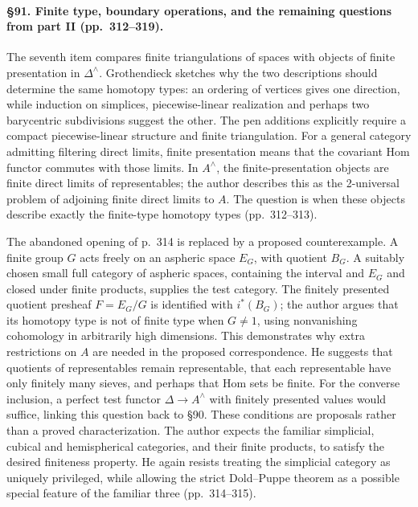 \paragraph{\S91. Finite type, boundary operations, and the remaining questions from part II (pp.\ 312--319).}
The seventh item compares finite triangulations of spaces with objects of finite presentation in $\Delta^\wedge$. Grothendieck sketches why the two descriptions should determine the same homotopy types: an ordering of vertices gives one direction, while induction on simplices, piecewise-linear realization and perhaps two barycentric subdivisions suggest the other. The pen additions explicitly require a compact piecewise-linear structure and finite triangulation. For a general category admitting filtering direct limits, finite presentation means that the covariant Hom functor commutes with those limits. In $A^\wedge$, the finite-presentation objects are finite direct limits of representables; the author describes this as the 2-universal problem of adjoining finite direct limits to $A$. The question is when these objects describe exactly the finite-type homotopy types (pp.\ 312--313).

The abandoned opening of p.\ 314 is replaced by a proposed counterexample. A finite group $G$ acts freely on an aspheric space $E_G$, with quotient $B_G$. A suitably chosen small full category of aspheric spaces, containing the interval and $E_G$ and closed under finite products, supplies the test category. The finitely presented quotient presheaf $F=E_G/G$ is identified with $i^*(B_G)$; the author argues that its homotopy type is not of finite type when $G\ne1$, using nonvanishing cohomology in arbitrarily high dimensions. This demonstrates why extra restrictions on $A$ are needed in the proposed correspondence. He suggests that quotients of representables remain representable, that each representable have only finitely many sieves, and perhaps that Hom sets be finite. For the converse inclusion, a perfect test functor $\Delta\to A^\wedge$ with finitely presented values would suffice, linking this question back to \S90. These conditions are proposals rather than a proved characterization. The author expects the familiar simplicial, cubical and hemispherical categories, and their finite products, to satisfy the desired finiteness property. He again resists treating the simplicial category as uniquely privileged, while allowing the strict Dold--Puppe theorem as a possible special feature of the familiar three (pp.\ 314--315).

